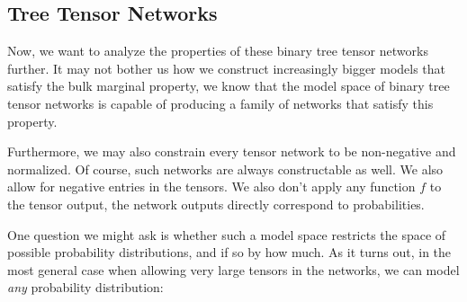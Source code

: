 \documentclass[../../main.tex]{subfiles}
\begin{document}
\subsection{Tree Tensor Networks}
    Now, we want to analyze the properties of these binary tree tensor networks further. It may not bother us how we construct increasingly bigger models that satisfy the bulk marginal property, we know that the model space of binary tree tensor networks is capable of producing a family of networks that satisfy this property.

    Furthermore, we may also constrain every tensor network to be non-negative and normalized. Of course, such networks are always constructable as well. We also allow for negative entries in the tensors. We also don't apply any function $f$ to the tensor output, the network outputs directly correspond to probabilities.

    One question we might ask is whether such a model space restricts the space of possible probability distributions, and if so by how much. As it turns out, in the most general case when allowing very large tensors in the networks, we can model \emph{any} probability distribution:
\end{document}
